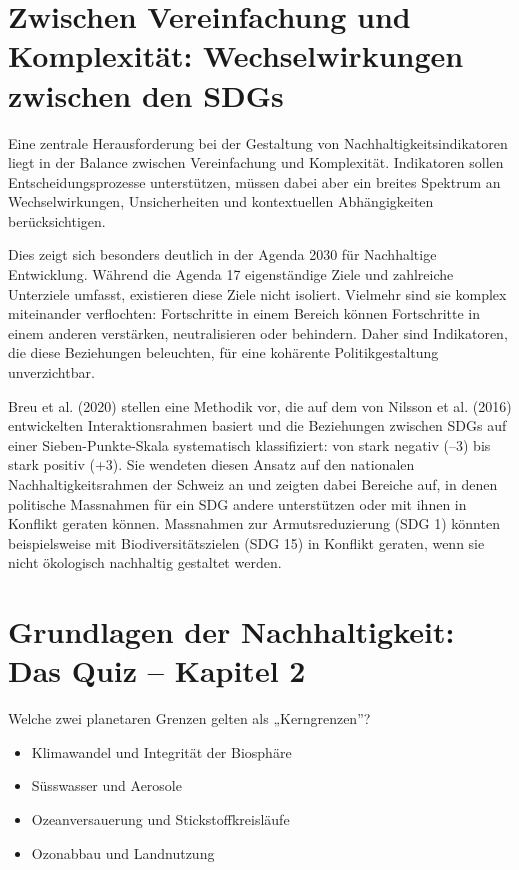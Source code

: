 \documentclass[
  nswissgerman,
  a4paper,
  DIV=11,
  numbers=noendperiod,
  oneside,
  openany]{scrreprt}
\providecommand{\tightlist}{%
  \setlength{\itemsep}{0pt}\setlength{\parskip}{0pt}}
\begin{document}
\section{Zwischen Vereinfachung und Komplexität: Wechselwirkungen
zwischen den
SDGs}\label{zwischen-vereinfachung-und-komplexituxe4t-wechselwirkungen-zwischen-den-sdgs}

Eine zentrale Herausforderung bei der Gestaltung von
Nachhaltigkeitsindikatoren liegt in der Balance zwischen Vereinfachung
und Komplexität. Indikatoren sollen Entscheidungsprozesse unterstützen,
müssen dabei aber ein breites Spektrum an Wechselwirkungen,
Unsicherheiten und kontextuellen Abhängigkeiten berücksichtigen.

Dies zeigt sich besonders deutlich in der Agenda 2030 für Nachhaltige
Entwicklung. Während die Agenda 17 eigenständige Ziele und zahlreiche
Unterziele umfasst, existieren diese Ziele nicht isoliert. Vielmehr sind
sie komplex miteinander verflochten: Fortschritte in einem Bereich
können Fortschritte in einem anderen verstärken, neutralisieren oder
behindern. Daher sind Indikatoren, die diese Beziehungen beleuchten, für
eine kohärente Politikgestaltung unverzichtbar.

Breu et al. (2020) stellen eine Methodik vor, die auf dem von Nilsson et
al. (2016) entwickelten Interaktionsrahmen basiert und die Beziehungen
zwischen SDGs auf einer Sieben-Punkte-Skala systematisch klassifiziert:
von stark negativ (--3) bis stark positiv (+3). Sie wendeten diesen
Ansatz auf den nationalen Nachhaltigkeitsrahmen der Schweiz an und
zeigten dabei Bereiche auf, in denen politische Massnahmen für ein SDG
andere unterstützen oder mit ihnen in Konflikt geraten können.
Massnahmen zur Armutsreduzierung (SDG 1) könnten beispielsweise mit
Biodiversitätszielen (SDG 15) in Konflikt geraten, wenn sie nicht
ökologisch nachhaltig gestaltet werden.

\section{Grundlagen der Nachhaltigkeit: Das Quiz -- Kapitel
2}\label{grundlagen-der-nachhaltigkeit-das-quiz-kapitel-2}

Welche zwei planetaren Grenzen gelten als „Kerngrenzen''?

\begin{itemize}
\tightlist
\item[$\square$]
  Klimawandel und Integrität der Biosphäre
\item[$\square$]
  Süsswasser und Aerosole
\item[$\square$]
  Ozeanversauerung und Stickstoffkreisläufe
\item[$\square$]
  Ozonabbau und Landnutzung
\end{itemize}
\end{document}
